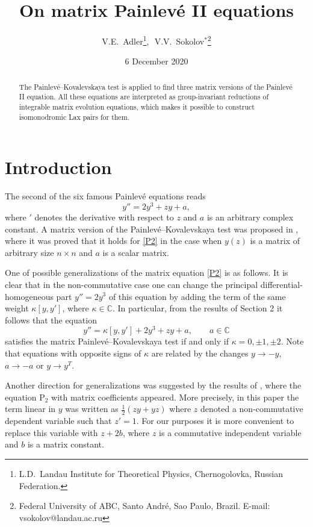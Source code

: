 \documentclass{article}
\title{On matrix Painlev\'e II equations}
\date{6 December 2020}
\author{V.E.~Adler\thanks{L.D.~Landau Institute for Theoretical Physics, Chernogolovka, Russian Federation.}, 
\,\,V.V.~Sokolov$^*$\thanks{Federal University of ABC, Santo Andr\'e, Sao Paulo, Brazil. E-mail: vsokolov@landau.ac.ru}}
\theoremstyle{plain}
\theoremstyle{definition}
\begin{document}
\maketitle

\begin{abstract}
The Painlev\'e--Kovalevskaya test is applied to find three matrix versions of the Painlev\'e II equation. All these equations are interpreted as group-invariant  reductions of integrable matrix evolution equations, which makes it possible to construct isomonodromic Lax pairs for them.
\medskip

\end{abstract}

\section{Introduction}

The second of the six famous Painlev\'e equations reads
\begin{equation}\label{P2}
 y''= 2 y^3 +z y + a,
\end{equation}
where $'$ denotes the derivative with respect to $z$ and $a$ is an arbitrary complex constant. A matrix version of the Painlev\'e--Kovalevskaya test was proposed in \cite{Balandin_Sokolov_1998}, where it was proved that it holds for \eqref{P2} in the case when $y(z)$ is a matrix of arbitrary size $n\times n$ and $a$ is a scalar matrix.   

One of possible generalizations of the matrix equation \eqref{P2} is as follows. It is clear that in the non-commutative case one can change the principal differential-homogeneous part $y''= 2 y^3$ of this equation by adding the term of the same weight $\kappa [y, y']$, where $\kappa\in{\mathbb C}$. In particular, from the results of Section 2 it follows that the equation
$$
 y''= \kappa [y,y'] +2y^3 +z y +a,\qquad a\in \mathbb C
$$
satisfies the matrix Painlev\'e--Kovalevskaya test if and only if $\kappa = 0, \pm 1, \pm 2.$ Note that equations with opposite signs of $\kappa$ are related by the changes $y\to -y$, $a\to -a$ or $y\to y^T$.

Another direction for generalizations was suggested by the results of \cite{Retakh_Rubtsov_2010}, where the equation P$_2$ with matrix coefficients appeared. More precisely, in this paper the term linear in $y$ was written as $\tfrac{1}{2}(zy+yz)$ where $z$ denoted a non-commutative dependent variable such that $z'= 1$. For our purposes it is more convenient to replace this variable with $z+2b$, where $z$ is a commutative independent variable and $b$ is a matrix constant.
\end{document}
